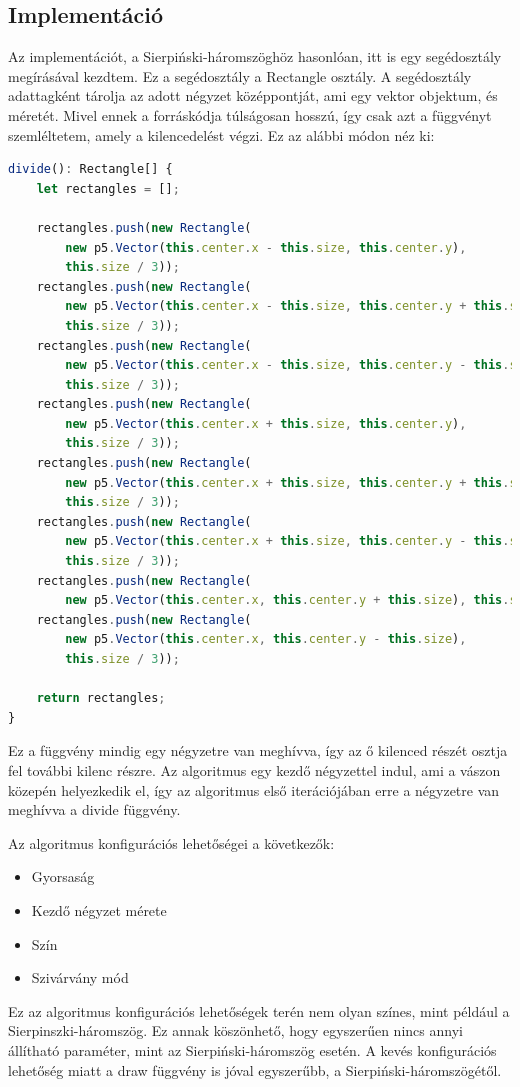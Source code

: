 \subsection*{Implementáció}
Az implementációt, a Sierpiński-háromszöghöz hasonlóan, itt is egy segédosztály megírásával kezdtem. Ez a segédosztály a Rectangle osztály. A segédosztály adattagként tárolja az adott négyzet középpontját, ami egy vektor objektum, és méretét. Mivel ennek a forráskódja túlságosan hosszú, így csak azt a függvényt szemléltetem, amely a kilencedelést végzi. Ez az alábbi módon néz ki:
\begin{lstlisting}[language=typescript]
divide(): Rectangle[] {
	let rectangles = [];
	
	rectangles.push(new Rectangle(
		new p5.Vector(this.center.x - this.size, this.center.y), 
		this.size / 3));
	rectangles.push(new Rectangle(
		new p5.Vector(this.center.x - this.size, this.center.y + this.size), 
		this.size / 3));
	rectangles.push(new Rectangle(
		new p5.Vector(this.center.x - this.size, this.center.y - this.size), 
		this.size / 3));
	rectangles.push(new Rectangle(
		new p5.Vector(this.center.x + this.size, this.center.y), 
		this.size / 3));
	rectangles.push(new Rectangle(
		new p5.Vector(this.center.x + this.size, this.center.y + this.size), 
		this.size / 3));
	rectangles.push(new Rectangle(
		new p5.Vector(this.center.x + this.size, this.center.y - this.size), 
		this.size / 3));
	rectangles.push(new Rectangle(
		new p5.Vector(this.center.x, this.center.y + this.size), this.size / 3));
	rectangles.push(new Rectangle(
		new p5.Vector(this.center.x, this.center.y - this.size), 
		this.size / 3));
	
	return rectangles;
}
\end{lstlisting}
Ez a függvény mindig egy négyzetre van meghívva, így az ő kilenced részét osztja fel további kilenc részre. Az algoritmus egy kezdő négyzettel indul, ami a vászon közepén helyezkedik el, így az algoritmus első iterációjában erre a négyzetre van meghívva a divide függvény. 
\par Az algoritmus konfigurációs lehetőségei a következők:
\begin{itemize}
	\item Gyorsaság
	\item Kezdő négyzet mérete
	\item Szín 
	\item Szivárvány mód
\end{itemize}
Ez az algoritmus konfigurációs lehetőségek terén nem olyan színes, mint például a Sierpinszki-háromszög. Ez annak köszönhető, hogy egyszerűen nincs annyi állítható paraméter, mint az Sierpiński-háromszög esetén. A kevés konfigurációs lehetőség miatt a draw függvény is jóval egyszerűbb, a Sierpiński-háromszögétől.
